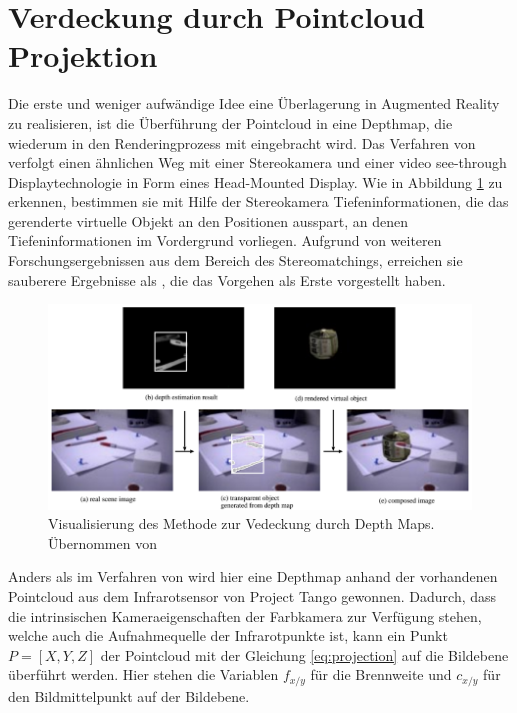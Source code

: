 \section{Verdeckung durch Pointcloud Projektion} \label{sec:pc-projection}

Die erste und weniger aufwändige Idee eine Überlagerung in Augmented Reality zu realisieren, ist die Überführung der Pointcloud in eine Depthmap, die wiederum in den Renderingprozess mit eingebracht wird. Das Verfahren von \citet{kanbara2000stereoscopic} verfolgt einen ähnlichen Weg mit einer Stereokamera und einer video see-through Displaytechnologie in Form eines Head-Mounted Display. Wie in Abbildung \ref{fig:stereo-depth-map} zu erkennen, bestimmen sie mit Hilfe der Stereokamera Tiefeninformationen, die das gerenderte virtuelle Objekt an den Positionen ausspart, an denen Tiefeninformationen im Vordergrund vorliegen. Aufgrund von weiteren Forschungsergebnissen aus dem Bereich des Stereomatchings, erreichen sie sauberere Ergebnisse als \citet{wloka1995resolving}, die das Vorgehen als Erste vorgestellt haben.

\begin{figure}[h]
  \centering
	\includegraphics[width=1.0\textwidth]{content/images/methods/stereo-depth-map.png} 
  \caption{Visualisierung des Methode zur Vedeckung durch Depth Maps. Übernommen von \citet{kanbara2000stereoscopic}}
  \label{fig:stereo-depth-map}
\end{figure}

Anders als im Verfahren von \citet{kanbara2000stereoscopic} wird hier eine Depthmap anhand der vorhandenen Pointcloud aus dem Infrarotsensor von Project Tango gewonnen. Dadurch, dass die intrinsischen Kameraeigenschaften der Farbkamera zur Verfügung stehen, welche auch die Aufnahmequelle der Infrarotpunkte ist, kann ein Punkt \(P = [X, Y, Z]\) der Pointcloud mit der Gleichung \ref{eq:projection} auf die Bildebene überführt werden. Hier stehen die Variablen \(f_{x/y}\) für die Brennweite und \(c_{x/y}\) für den Bildmittelpunkt auf der Bildebene. \citep{Tango90:online}

